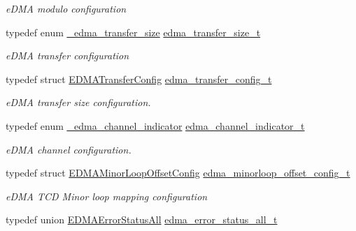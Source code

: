 \begin{DoxyCompactItemize}
\begin{DoxyCompactList}\small\item\em e\+D\+MA modulo configuration \end{DoxyCompactList}\item 
typedef enum \hyperlink{group__edma__hal_ga4ffcbd8f86285f5c162ae70a6fe155bd}{\+\_\+edma\+\_\+transfer\+\_\+size} \hyperlink{group__edma__hal_ga3cd26ca8831986959f668621f2e52d32}{edma\+\_\+transfer\+\_\+size\+\_\+t}\hypertarget{group__edma__hal_ga3cd26ca8831986959f668621f2e52d32}{}\label{group__edma__hal_ga3cd26ca8831986959f668621f2e52d32}

\begin{DoxyCompactList}\small\item\em e\+D\+MA transfer configuration \end{DoxyCompactList}\item 
typedef struct \hyperlink{structEDMATransferConfig}{E\+D\+M\+A\+Transfer\+Config} \hyperlink{group__edma__hal_ga01fdc7ba04e6c4187630c6480746c40d}{edma\+\_\+transfer\+\_\+config\+\_\+t}
\begin{DoxyCompactList}\small\item\em e\+D\+MA transfer size configuration. \end{DoxyCompactList}\item 
typedef enum \hyperlink{group__edma__hal_ga345c5302dbe76db009c0240e1e325797}{\+\_\+edma\+\_\+channel\+\_\+indicator} \hyperlink{group__edma__hal_ga232a0cfe340402eda7039baa8889a161}{edma\+\_\+channel\+\_\+indicator\+\_\+t}\hypertarget{group__edma__hal_ga232a0cfe340402eda7039baa8889a161}{}\label{group__edma__hal_ga232a0cfe340402eda7039baa8889a161}

\begin{DoxyCompactList}\small\item\em e\+D\+MA channel configuration. \end{DoxyCompactList}\item 
typedef struct \hyperlink{structEDMAMinorLoopOffsetConfig}{E\+D\+M\+A\+Minor\+Loop\+Offset\+Config} \hyperlink{group__edma__hal_gad5e547af3f3fbe7a4250c05007e65ce9}{edma\+\_\+minorloop\+\_\+offset\+\_\+config\+\_\+t}\hypertarget{group__edma__hal_gad5e547af3f3fbe7a4250c05007e65ce9}{}\label{group__edma__hal_gad5e547af3f3fbe7a4250c05007e65ce9}

\begin{DoxyCompactList}\small\item\em e\+D\+MA T\+CD Minor loop mapping configuration \end{DoxyCompactList}\item 
typedef union \hyperlink{unionEDMAErrorStatusAll}{E\+D\+M\+A\+Error\+Status\+All} \hyperlink{group__edma__hal_gafe6a334451dfc7c6e2abb8598a05a7d4}{edma\+\_\+error\+\_\+status\+\_\+all\+\_\+t}\hypertarget{group__edma__hal_gafe6a334451dfc7c6e2abb8598a05a7d4}{}\label{group__edma__hal_gafe6a334451dfc7c6e2abb8598a05a7d4}


\end{DoxyCompactItemize}
